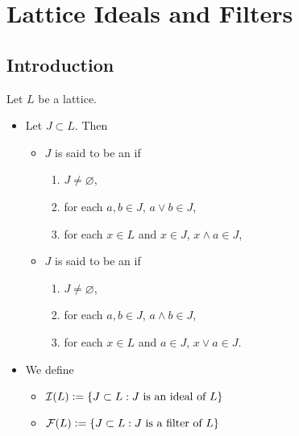 \documentclass{book}
\begin{document}
	
	
	
	
	
	
	
	
	
	
	
	
	
	
	
	
	
	
	
	
	
	
	
	
	
	
	
	
	
	
	
	
	
	
	
	
	
	
	
	
	
	
	
	
	
	
	\newpage
	\section{Lattice Ideals and Filters}

	\subsection{Introduction}
	
	\begin{defn}
		Let $L$ be a lattice.  
		\begin{itemize}
			\item Let $J \subset L$. Then
			\begin{itemize}
				\item $J$ is said to be an  if 
				\begin{enumerate}
					\item $J \neq \varnothing$,
					\item for each $a,b \in J$, $a \vee b \in J$,
					\item for each $x \in L$ and $x \in J$, $x \wedge a \in J$,
				\end{enumerate}
				\item $J$ is said to be an  if 
				\begin{enumerate}
					\item $J \neq \varnothing$,
					\item for each $a,b \in J$, $a \wedge b \in J$,
					\item for each $x \in L$ and $a \in J$, $x \vee a \in J$.
				\end{enumerate}
			\end{itemize}
			\item We define 
			\begin{itemize}
				\item $\mathcal{I}(L) \vcentcolon= \{J \subset L: \text{$J$ is an ideal of $L$}\}$
				\item $\mathcal{F}(L) \vcentcolon= \{J \subset L: \text{$J$ is a filter of $L$}\}$
			\end{itemize}
		\end{itemize}
	\end{defn}
	
\end{document}
